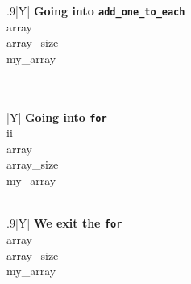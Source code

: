 \documentclass[a4paper]{article}
\begin{document}
\begin{table}[H]
    \begin{subfigure}{0.4\linewidth}
        \centering
        \begin{tabularx}{.9\linewidth}{|Y|}
        \hline
        \textbf{Going into \texttt{add\_one\_to\_each}} \\\hline
        array\\\hline
        array\_size\\\hline
        my\_array\\\hline
        \\ \hline
        \\ \hline
        \end{tabularx}
    \end{subfigure}%
    \begin{subfigure}{0.2\linewidth}
        \centering
        \begin{tabularx}{\linewidth}{|Y|}
        \hline
        \textbf{Going into \texttt{for}} \\\hline
        ii\\\hline
        array\\\hline
        array\_size\\\hline
        my\_array\\\hline
        \\ \hline
        \end{tabularx}
    \end{subfigure}%
    \begin{subfigure}{0.4\linewidth}
        \centering
        \begin{tabularx}{.9\linewidth}{|Y|}
        \hline
        \textbf{We exit the \texttt{for}}\\\hline
        array\\\hline
        array\_size\\\hline
        my\_array\\\hline
        \\ \hline
        \\ \hline
        \end{tabularx}
    \end{subfigure}%



\end{table}
\end{document}

